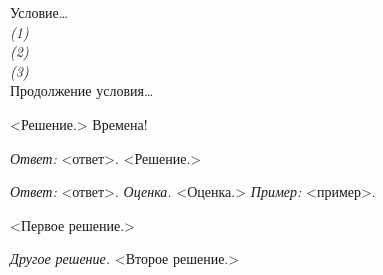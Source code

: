 Условие\ldots
\\\emph{(1)}
\\\emph{(2)}
\\\emph{(3)}
\\
Продолжение условия\ldots

\solution
<Решение.>
Времена!

\solution
\emph{Ответ:} <ответ>.
<Решение.>

\solution
\emph{Ответ:} <ответ>.
\emph{Оценка.}
<Оценка.>
\emph{Пример:} <пример>.

\solution
<Первое решение.>
\par
\emph{Другое решение.}
<Второе решение.>

%

